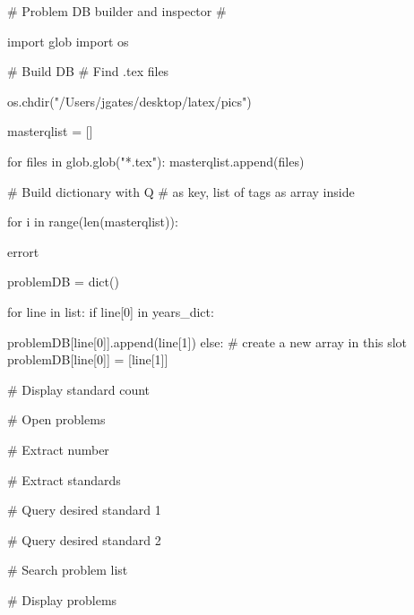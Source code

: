 # Problem DB builder and inspector
#

import glob
import os

# Build DB
# Find .tex files

os.chdir("/Users/jgates/desktop/latex/pics")

masterqlist = []

for files in glob.glob("*.tex"):
    masterqlist.append(files)

# Build dictionary with Q # as key, list of tags as array inside

for i in range(len(masterqlist)):
    

errort

problemDB = dict()

for line in list:
    if line[0] in years_dict:
     
        problemDB[line[0]].append(line[1])
    else:
        # create a new array in this slot
        problemDB[line[0]] = [line[1]]

    
# Display standard count

# Open problems

# Extract number

# Extract standards

# Query desired standard 1

# Query desired standard 2

# Search problem list

# Display problems


